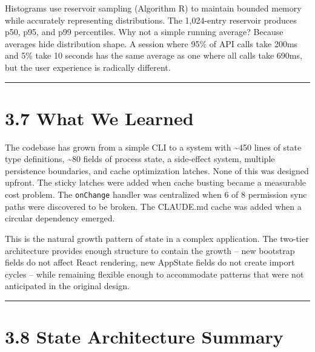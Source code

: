 \documentclass[
  english,
  11pt,
  letterpaper,
]{book}
\begin{document}
Histograms use reservoir sampling (Algorithm R) to maintain bounded
memory while accurately representing distributions. The 1,024-entry
reservoir produces p50, p95, and p99 percentiles. Why not a simple
running average? Because averages hide distribution shape. A session
where 95\% of API calls take 200ms and 5\% take 10 seconds has the same
average as one where all calls take 690ms, but the user experience is
radically different.

\begin{center}\rule{0.5\linewidth}{0.5pt}\end{center}

\section{3.7 What We Learned}\label{what-we-learned}

The codebase has grown from a simple CLI to a system with
\textasciitilde450 lines of state type definitions, \textasciitilde80
fields of process state, a side-effect system, multiple persistence
boundaries, and cache optimization latches. None of this was designed
upfront. The sticky latches were added when cache busting became a
measurable cost problem. The \texttt{onChange} handler was centralized
when 6 of 8 permission sync paths were discovered to be broken. The
CLAUDE.md cache was added when a circular dependency emerged.

This is the natural growth pattern of state in a complex application.
The two-tier architecture provides enough structure to contain the
growth -- new bootstrap fields do not affect React rendering, new
AppState fields do not create import cycles -- while remaining flexible
enough to accommodate patterns that were not anticipated in the original
design.

\begin{center}\rule{0.5\linewidth}{0.5pt}\end{center}

\section{3.8 State Architecture
Summary}\label{state-architecture-summary}
\end{document}
